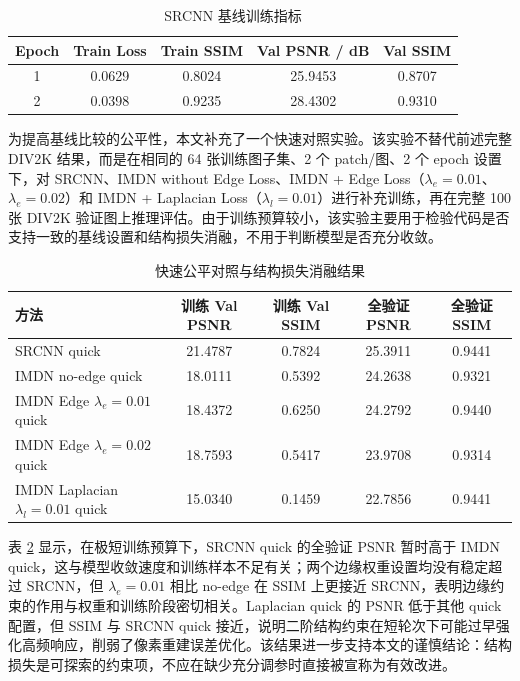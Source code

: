 \documentclass[bwprint]{report}
\begin{document}
\begin{table}[H]
    \centering
    \caption{SRCNN 基线训练指标}
    \label{tab:srcnn-metrics}
    \begin{tabular}{ccccc}
        \toprule
        Epoch & Train Loss & Train SSIM & Val PSNR / dB & Val SSIM \\
        \midrule
        1 & 0.0629 & 0.8024 & 25.9453 & 0.8707 \\
        2 & 0.0398 & 0.9235 & 28.4302 & 0.9310 \\
        \bottomrule
    \end{tabular}
\end{table}

为提高基线比较的公平性，本文补充了一个快速对照实验。该实验不替代前述完整 DIV2K 结果，而是在相同的 64 张训练图子集、2 个 patch/图、2 个 epoch 设置下，对 SRCNN、IMDN without Edge Loss、IMDN + Edge Loss（$\lambda_e=0.01$、$\lambda_e=0.02$）和 IMDN + Laplacian Loss（$\lambda_l=0.01$）进行补充训练，再在完整 100 张 DIV2K 验证图上推理评估。由于训练预算较小，该实验主要用于检验代码是否支持一致的基线设置和结构损失消融，不用于判断模型是否充分收敛。

\begin{table}[H]
    \centering
    \caption{快速公平对照与结构损失消融结果}
    \label{tab:quick-fair-ablation}
    \small
    \begin{tabular}{>{\raggedright\arraybackslash}p{3.6cm}cccc}
        \toprule
        方法 & 训练 Val PSNR & 训练 Val SSIM & 全验证 PSNR & 全验证 SSIM \\
        \midrule
        SRCNN quick & 21.4787 & 0.7824 & 25.3911 & 0.9441 \\
        IMDN no-edge quick & 18.0111 & 0.5392 & 24.2638 & 0.9321 \\
        IMDN Edge $\lambda_e=0.01$ quick & 18.4372 & 0.6250 & 24.2792 & 0.9440 \\
        IMDN Edge $\lambda_e=0.02$ quick & 18.7593 & 0.5417 & 23.9708 & 0.9314 \\
        IMDN Laplacian $\lambda_l=0.01$ quick & 15.0340 & 0.1459 & 22.7856 & 0.9441 \\
        \bottomrule
    \end{tabular}
\end{table}

表 \ref{tab:quick-fair-ablation} 显示，在极短训练预算下，SRCNN quick 的全验证 PSNR 暂时高于 IMDN quick，这与模型收敛速度和训练样本不足有关；两个边缘权重设置均没有稳定超过 SRCNN，但 $\lambda_e=0.01$ 相比 no-edge 在 SSIM 上更接近 SRCNN，表明边缘约束的作用与权重和训练阶段密切相关。Laplacian quick 的 PSNR 低于其他 quick 配置，但 SSIM 与 SRCNN quick 接近，说明二阶结构约束在短轮次下可能过早强化高频响应，削弱了像素重建误差优化。该结果进一步支持本文的谨慎结论：结构损失是可探索的约束项，不应在缺少充分调参时直接被宣称为有效改进。
\end{document}
